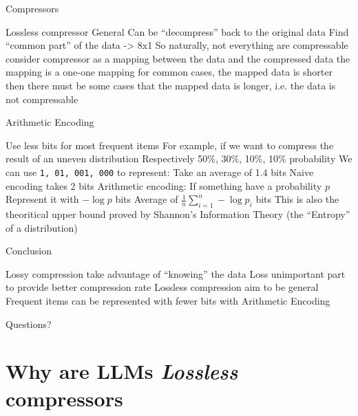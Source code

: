 \documentclass[scheme=plain]{ctexbeamer}
\begin{document}
\begin{frame}{Compressors}
  \begin{outline}
    \1 Lossless compressor
      \2 General
      \2 Can be ``decompress'' back to the original data
      \2 Find ``common part'' of the data
         -> 8x1
      \2 So naturally, not everything are compressable
        \pause
        \3 consider compressor as a mapping between the data and the compressed data
        \pause
        \3 the mapping is a one-one mapping
        \pause
        \3 for common cases, the mapped data is shorter
        \pause
        \3 then there must be some cases that the mapped data is longer, i.e. the data is not compressable
  \end{outline}
\end{frame}


\begin{frame}{Arithmetic Encoding}
  \begin{outline}
    \1 Use less bits for most frequent items
    \1 For example, if we want to compress the result of an uneven distribution
      \2 Respectively 50\%, 30\%, 10\%, 10\% probability
    \1 We can use \texttt{1, 01, 001, 000} to represent:
      \2 Take an average of 1.4 bits
      \2 Naive encoding takes 2 bits
    \pause
    \1 Arithmetic encoding:
      \2 If something have a probability $p$
      \2 Represent it with $- \log p$ bits
      \2 Average of $\frac{1}{n} \sum_{i=1}^{n} - \log p_i$ bits
        \3 This is also the theoritical upper bound proved by Shannon's Information Theory (the ``Entropy'' of a distribution)
  \end{outline}
\end{frame}

\begin{frame}{Conclusion}
  \begin{outline}
    \1 Lossy compression take advantage of ``knowing'' the data
      \2 Loss unimportant part to provide better compression rate
    \1 Lossless compression aim to be general
    \1 Frequent items can be represented with fewer bits with Arithmetic Encoding
  \end{outline}
\end{frame}

\begin{frame}[standout]
  Questions?
\end{frame}

\section[LLMs as compressors]{Why are LLMs \emph{Lossless} compressors}
\end{document}
